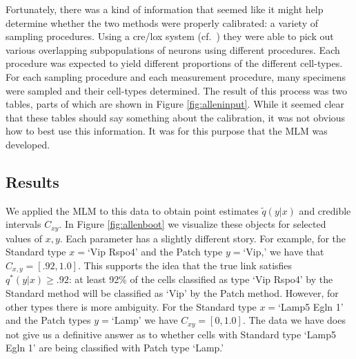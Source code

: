 Fortunately, there was a kind of information that seemed like it might help determine whether the two methods were properly calibrated: a variety of sampling procedures.  Using a cre/lox system (cf.\ \citep{tasic2017shared}) they were able to pick out various overlapping subpopulations of neurons using different procedures.  Each procedure was expected to yield different proportions of the different cell-types.  For each sampling procedure and each measurement procedure, many specimens were sampled and their cell-types determined.  The result of this process was two tables, parts of which are shown in Figure \ref{fig:alleninput}.  While it seemed clear that these tables should say something about the calibration, it was not obvious how to best use this information.  It was for this purpose that the MLM was developed.

\subsection{Results}


We applied the MLM to this data to obtain point estimates $\tilde q(y|x)$ and credible intervals $C_{x y}$.  In Figure \ref{fig:allenboot} we visualize these objects for selected values of $x,y$.  Each parameter has a slightly different story.  For example, for the Standard type $x=$`Vip Rspo4' and the Patch type $y=$`Vip,' we have that $C_{x,y}=[.92,1.0]$.  This supports the idea that the true link satisfies $q^*(y|x)\geq .92$: at least 92\% of the cells classified as type `Vip Rspo4' by the Standard method will be classified as `Vip' by the Patch method.  However, for other types there is more ambiguity.  For the Standard type $x=$`Lamp5 Egln 1' and the Patch types $y=$`Lamp' we have $C_{x y}=[0,1.0]$.  The data we have does not give us a definitive answer as to whether cells with Standard type `Lamp5 Egln 1' are being classified with Patch type `Lamp.'

